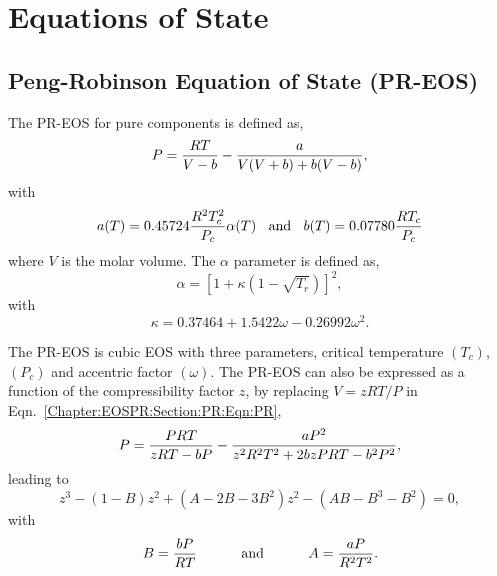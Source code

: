 

\chapter{Equations of State}\label{Chapter:EOSPR}

\section{Peng-Robinson Equation of State (PR-EOS)}\label{Chapter:EOSPR:Section:PR}
The PR-EOS for pure components is defined as,
   \begin{equation}
      P = \displaystyle\frac{RT}{V-b} - \displaystyle\frac{a}{V(V+b) + b(V-b)}\label{Chapter:EOSPR:Section:PR:Eqn:PR},
   \end{equation}
with
   \begin{displaymath}
      a(T)=0.45724\displaystyle\frac{R^{2}T_{c}^{2}}{P_{c}}\alpha(T)\;\;\text{ and }\;\;b(T) = 0.07780\displaystyle\frac{RT_{c}}{P_{c}}
   \end{displaymath}
where $V$ is the molar volume. The $\alpha$ parameter is defined as,
   \begin{equation}
         \alpha = \left[1 + \kappa\left(1 - \sqrt{T_{r}}\right)\right]^{2},
   \end{equation}
with
   \begin{equation}
         \kappa = 0.37464 + 1.5422\omega - 0.26992\omega^{2}.\label{Chapter:EOSPR:Section:PR:Eqn:PR_k}
   \end{equation}

The PR-EOS is cubic EOS with three parameters, critical temperature $\left(T_{c}\right)$, $\left(P_{c}\right)$ and accentric factor $\left(\omega\right)$. The PR-EOS can also be expressed as a function of the compressibility factor $z$, by replacing $V=zRT/P$ in Eqn.~\ref{Chapter:EOSPR:Section:PR:Eqn:PR},
   \begin{displaymath}
           P = \displaystyle\frac{PRT}{zRT-bP} - \displaystyle\frac{aP^{2}}{z^{2}R^{2}T^{2} +2bzPRT-b^{2}P^{2}},
   \end{displaymath} 
leading to 
   \begin{equation}
      z^{3} -\left(1-B\right)z^{2} + \left(A-2B-3B^{2}\right)z^{2} - \left(AB -B^{3} - B^{2}\right) = 0,\label{Chapter:EOSPR:Section:PR:Eqn:CubicPR_Z}
   \end{equation}
with
\begin{equation}
B = \displaystyle\frac{bP}{RT} \hspace{1cm}\text{ and }\hspace{1cm} A =\displaystyle\frac{aP}{R^{2}T^{2}}.\label{Chapter:EOSPR:Section:PR:Eqn:CubicPR_Z_Parameters}
\end{equation}

